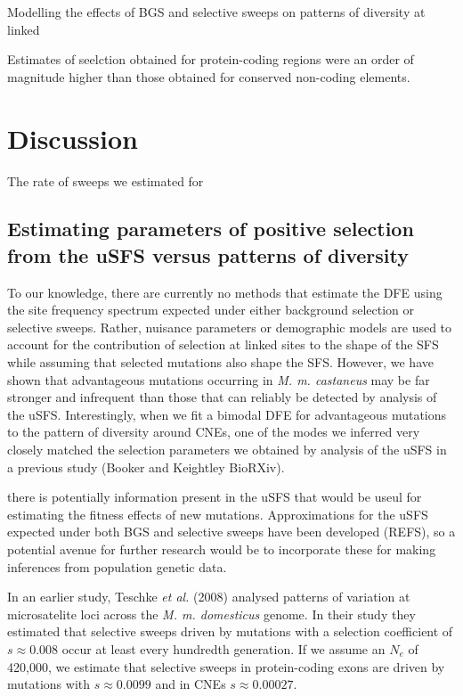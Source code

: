 \documentclass[11pt]{article}
\begin{document}
Modelling the effects of BGS and selective sweeps on patterns of diversity at linked 


Estimates of seelction obtained for protein-coding regions were an order of magnitude higher than those obtained for conserved non-coding elements. 




\section*{Discussion}

The rate of sweeps we estimated for 

\subsection*{Estimating parameters of positive selection from the uSFS versus patterns of diversity}

To our knowledge, there are currently no methods that estimate the DFE using the site frequency spectrum expected under either background selection or selective sweeps. Rather, nuisance parameters or demographic models are used to account for the contribution of selection at linked sites to the shape of the SFS while assuming that selected mutations also shape the SFS. 
However, we have shown that advantageous mutations occurring in \textit{M. m. castaneus} may be far stronger and infrequent than those that can reliably be detected by analysis of the uSFS. Interestingly, when we fit a bimodal DFE for advantageous mutations to the pattern of diversity around CNEs, one of the modes we inferred very closely matched the selection parameters we obtained by analysis of the uSFS in a previous study (Booker and Keightley BioRXiv).

there is potentially information present in the uSFS that would be useul for estimating the fitness effects of new mutations. Approximations for the uSFS expected under both BGS and selective sweeps have been developed (REFS), so a potential avenue for further research would be to incorporate these for making inferences from population genetic data.

In an earlier study, Teschke \textit{et al.} (2008) analysed patterns of variation at microsatelite loci across the \textit{M. m. domesticus} genome. In their study they estimated that selective sweeps driven by mutations with a selection coefficient of $s \approx 0.008$ occur at least every hundredth generation. If we assume an $N_e$ of 420,000, we estimate that selective sweeps in protein-coding exons are driven by mutations with $s \approx 0.0099$ and in CNEs $s \approx 0.00027$. 
\end{document}
